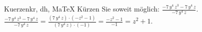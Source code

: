 \begin{MAufgabe}{Kuerzen}{kr, dh, MaTeX}
K\"urzen Sie soweit m\"oglich: $\frac{ - 7\, y^4\, z^3 - 7\, y^4\, z}{- 7\, y^4\, z}$.\\ 
\ifLsg\MLoesung
\quad $\frac{ - 7\, y^4\, z^3 - 7\, y^4\, z}{- 7\, y^4\, z}=\frac{(7\, y^4\, z)\cdot( - z^2 - 1)}{(7\, y^4\, z)\cdot(-1)}=\frac{ - z^2 - 1}{-1}=z^2 + 1$.\else\relax\fi
 \end{MAufgabe}